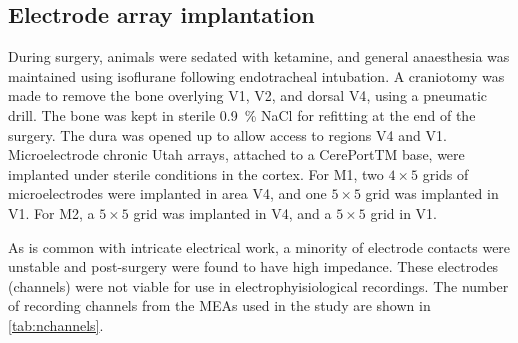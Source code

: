 \subsection{Electrode array implantation}

During surgery, animals were sedated with ketamine, and general anaesthesia was maintained using isoflurane following endotracheal intubation.
A craniotomy was made to remove the bone overlying \ac{V1}, \ac{V2}, and dorsal \ac{V4}, using a pneumatic drill.
The bone was kept in sterile \SI{0.9}{\percent} \ac{NaCl} for refitting at the end of the surgery.
The dura was opened up to allow access to regions \ac{V4} and \ac{V1}.
Microelectrode chronic Utah arrays, attached to a CerePortTM base, were implanted under sterile conditions in the cortex.
For \ac{M1}, two $4{\times}5$ grids of microelectrodes were implanted in area \ac{V4}, and one $5{\times}5$ grid was implanted in \ac{V1}.
For \ac{M2}, a $5{\times}5$ grid was implanted in \ac{V4}, and a $5{\times}5$ grid in \ac{V1}.

As is common with intricate electrical work, a minority of electrode contacts were unstable and post-surgery were found to have high impedance.
These electrodes (channels) were not viable for use in electrophyisiological recordings.
The number of recording channels from the \acp{MEA} used in the study are shown in \autoref{tab:nchannels}.

